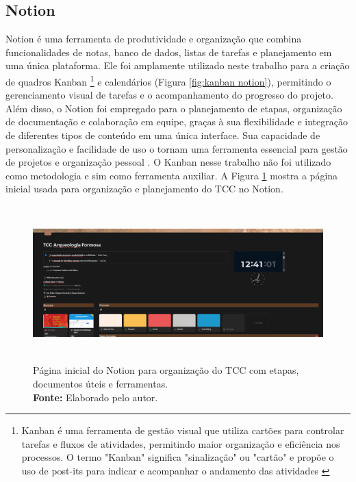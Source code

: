 \subsection{Notion}
 Notion é uma ferramenta de produtividade e organização que combina funcionalidades de notas, banco de dados, listas de tarefas e planejamento em uma única plataforma. Ele foi amplamente utilizado neste trabalho para a criação de quadros Kanban \footnote{Kanban é uma ferramenta de gestão visual que utiliza cartões para controlar tarefas e fluxos de atividades, permitindo maior organização e eficiência nos processos. O termo "Kanban" significa "sinalização" ou "cartão" e propõe o uso de post-its para indicar e acompanhar o andamento das atividades \citep{aguiar2007compreendendo}} e calendários (Figura \ref{fig:kanban notion}), permitindo o gerenciamento visual de tarefas e o acompanhamento do progresso do projeto. Além disso, o Notion foi empregado para o planejamento de etapas, organização de documentação e colaboração em equipe, graças à sua flexibilidade e integração de diferentes tipos de conteúdo em uma única interface. Sua capacidade de personalização e facilidade de uso o tornam uma ferramenta essencial para gestão de projetos e organização pessoal \citep{notion}.
 O Kanban nesse trabalho não foi utilizado como metodologia e sim como ferramenta auxiliar.
 A Figura \ref{fig:notion inicial} mostra a página inicial usada para organização e planejamento do TCC no Notion.

\begin{figure}[H]
    \centering
    \includegraphics[height=6cm, keepaspectratio]{img/Notion/pagina inicial.png}
    \caption{ Página inicial do Notion para organização do TCC com etapas, \\ documentos úteis e ferramentas. \\
        \textbf{Fonte:} Elaborado pelo autor.}
    \label{fig:notion inicial}
\end{figure}

